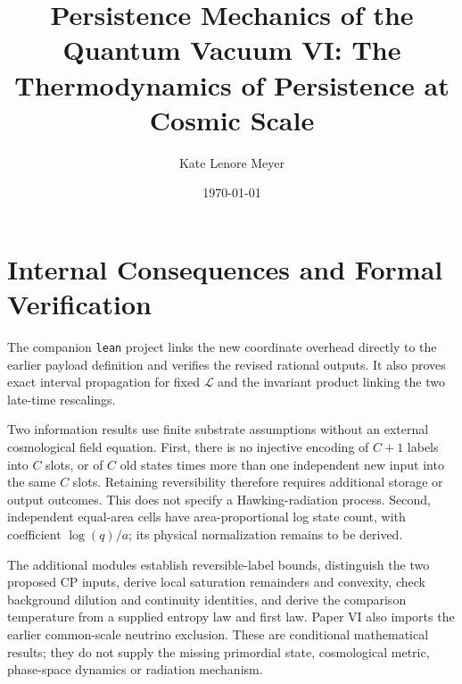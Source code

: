 \documentclass[aps,prd,twocolumn,showpacs,superscriptaddress,groupedaddress,nofootinbib,english,floatfix]{revtex4-2}
\def\PMpaperdir{paper/}
\def\PMpaperdir{}
\begin{document}
\title{Persistence Mechanics of the Quantum Vacuum VI: The Thermodynamics of Persistence at Cosmic Scale}


\author{Kate Lenore Meyer}

\date{\today}



\maketitle %











\appendix
\section{Internal Consequences and Formal Verification}
The companion \texttt{lean} project links the new coordinate overhead directly to the earlier payload definition and verifies the revised rational outputs. It also proves exact interval propagation for fixed $\mathcal L$ and the invariant product linking the two late-time rescalings.

Two information results use finite substrate assumptions without an external cosmological field equation. First, there is no injective encoding of $C+1$ labels into $C$ slots, or of $C$ old states times more than one independent new input into the same $C$ slots. Retaining reversibility therefore requires additional storage or output outcomes. This does not specify a Hawking-radiation process. Second, independent equal-area cells have area-proportional log state count, with coefficient $\log(q)/a$; its physical normalization remains to be derived.

The additional modules establish reversible-label bounds, distinguish the two proposed CP inputs, derive local saturation remainders and convexity, check background dilution and continuity identities, and derive the comparison temperature from a supplied entropy law and first law. Paper VI also imports the earlier common-scale neutrino exclusion. These are conditional mathematical results; they do not supply the missing primordial state, cosmological metric, phase-space dynamics or radiation mechanism.
\end{document}
